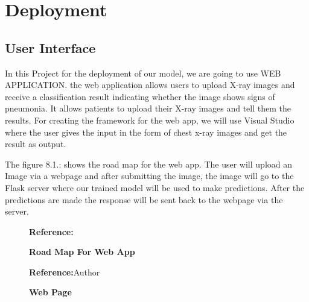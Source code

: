 %
%



\chapter{Deployment}
\section{User Interface}

In this Project for the deployment of our model, we are going to use WEB APPLICATION. the web application allows users to upload X-ray images and receive a classification result indicating whether the image shows signs of pneumonia. It allows patients to upload their X-ray images and tell them the results. 
For creating the framework for the web app, we will use Visual Studio where the user gives the input in the form of chest x-ray images and get the result as output.


The figure 8.1.: shows the road map for the web app. The user will upload an Image via a webpage and after submitting the image, the image will go to the Flask server where our trained model will be used to make predictions. After the predictions are made the response will be sent back to the webpage via the server.

\medskip

\begin{figure}
	\centering
	\caption{\textbf{Road Map For Web App}}
	\footnotesize \textbf{Reference:}\cite{Alhameed:2022}
	\label{fig:Road Map For Web App}
\end{figure}

\bigskip
\begin{figure}
	\centering
	\caption{\textbf{Web Page}}
	\footnotesize \textbf{Reference:}Author
	\label{fig:Web Page}
\end{figure}


